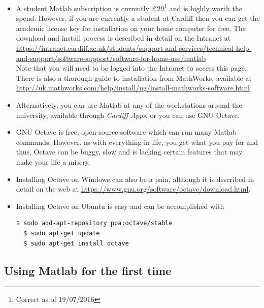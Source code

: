 \documentclass[12pt]{report}
\begin{document}
\begin{itemize}
\item A student Matlab subscription is currently £29\footnote{Correct as of 19/07/2016} and is highly worth the spend. However, if you are currently a student at Cardiff then you can get the academic license key for installation on your home computer for free. The download and install process is described in detail on the Intranet at \\
\footnotesize \url{https://intranet.cardiff.ac.uk/students/support-and-services/technical-help-and-support/software-support/software-for-home-use/matlab} \\
\normalsize
Note that you will need to be logged into the Intranet to access this page. \\ 
There is also a thorough guide to installation from MathWorks, available at \\
\footnotesize \url{http://uk.mathworks.com/help/install/ug/install-mathworks-software.html} \normalsize
\item Alternatively, you can use Matlab at any of the workstations around the university, available through \textit{Cardiff Apps}, or you can use GNU Octave.
\item GNU Octave is free, open-source software which can run many Matlab commands. However, as with everything in life, you get what you pay for and thus, Octave can be buggy, slow and is lacking certain features that may make your life a misery.
\item Installing Octave on Windows can also be a pain, although it is described in detail on the web at \url{https://www.gnu.org/software/octave/download.html}.
\item Installing Octave on Ubuntu is easy and can be accomplished with
\begin{lstlisting}[language=bash]
  $ sudo add-apt-repository ppa:octave/stable
  $ sudo apt-get update
  $ sudo apt-get install octave
\end{lstlisting}
\end{itemize}

\subsection*{Using Matlab for the first time}
\end{document}
